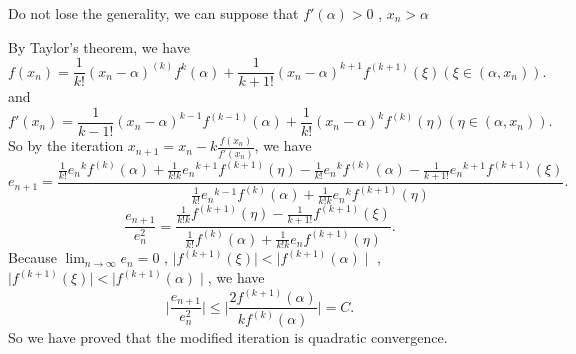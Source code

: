 \documentclass[twoside,a4paper]{article}
\begin{document}
Do not lose the generality, we can suppose that $f'\left( \alpha \right)>0 $
, $x_{n}>\alpha$

By Taylor's theorem, we have 
\[
	f\left( x_{n}\right)=\frac{1}{k!}
	\left( x_{n}-\alpha \right)^{\left( k \right) }f^{k}\left( \alpha \right)
	+\frac{1}{k+1!}
	\left( x_{n}-\alpha \right)^{k+1}f^{\left( k+1 \right) }\left(  \xi\right)  
	\left( \xi\in\left( \alpha, x_{n} \right)  \right) 
.\] 
and
\[
	f'\left( x_{n} \right)=\frac{1}{k-1!}
	\left(  x_{n}-\alpha\right)^{k-1}f^{\left( k-1 \right) }\left( \alpha \right)
	+\frac{1}{k!}
	\left( x_{n}-\alpha \right)^{k}f^{\left( k \right) }\left( \eta\right)  
	\left( \eta\in\left( \alpha, x_{n} \right)  \right) 
.\] 
So by the iteration $x_{n+1}=x_{n}-k\frac{f\left( x_{n} \right) }{f'\left( x_{n} \right) }$, we have
\[
e_{n+1}=\frac{\frac{1}{k!}{e_{n}}^{k}f^{\left(  k\right) }\left( \alpha \right)
+\frac{1}{k!k}{e_{n}}^{k+1}f^{\left( k+1 \right)}\left( \eta \right) 
-\frac{1}{k!}{e_{n}}^{k}f^{\left(  k\right) }\left( \alpha \right)
-\frac{1}{k+1!}{e_{n}}^{k+1}f^{\left( k+1 \right)}\left( \xi \right) 
}
{\frac{1}{k!}{e_{n}}^{k-1}f^{\left( k \right) }\left( \alpha\right) 
+\frac{1}{k!k}{e_{n}}^{k}f^{\left( k+1 \right)}\left( \eta \right) }
.\] 
\[
\frac{e_{n+1}}{e_{n}^{2}}=\frac
{\frac{1}{k!k}f^{\left( k+1 \right)}\left( \eta \right) 
-\frac{1}{k+1!}f^{\left( k+1 \right)}\left( \xi \right) 
}
{\frac{1}{k!}f^{\left( k \right) }\left( \alpha\right) 
+\frac{1}{k!k}{e_{n}}f^{\left( k+1 \right)}\left( \eta \right) }
.\] 
Because $\lim_{n\to\infty}e_{n}=0$
, $ \mid f^{\left( k+1 \right) }\left(  \xi\right)  \mid 
< \mid f^{\left(  k+1\right) }\left( \alpha \right)  \mid $
, $ \mid f^{\left( k+1 \right) }\left(  \xi\right)  \mid 
< \mid f^{\left(  k+1\right) }\left( \alpha \right)  \mid $, we have
\[
 \mid \frac{e_{n+1}}{e_{n}^2} \mid 
 \le  \mid \frac{2f^{\left( k+1 \right) }\left(  \alpha\right) }
{kf^{\left( k\right) }\left( \alpha \right) } \mid = C 
.\] 
So we have proved that the modified iteration is quadratic convergence.
\end{document}
